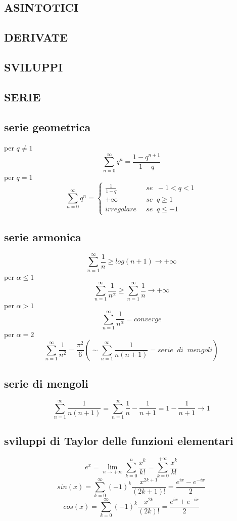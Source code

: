 \documentclass[a4paper, 9pt]{report}
\begin{document}
\subsection*{ASINTOTICI}
\subsection*{DERIVATE}
\subsection*{SVILUPPI}
\subsection*{SERIE}
\subsection*{serie geometrica}
per $q \neq 1$
\[
    \sum_{n=0}^{\infty}q^n = \frac{1-q^{n+1}}{1-q}
\]
per $q = 1$
\[
    \sum_{n=0}^{\infty}q^n = \begin{cases}
        \frac{1}{1-q} & se \;\; -1<q<1\\
        +\infty &se \;\; q \geq 1\\
        irregolare \;\;& se \;\; q\leq-1 
    \end{cases}
\]
\subsection*{serie armonica}
\[
    \sum_{n=1}^{\infty}\frac{1}{n} \geq log(n+1) \rightarrow +\infty
\]
per $\alpha \leq 1$ 
\[
    \sum_{n=1}^{\infty} \frac{1}{n^\alpha} \geq \sum_{n=1}^{\infty}\frac{1}{n} \rightarrow +\infty
\]
per $\alpha > 1$ 
\[
    \sum_{n=1}^{\infty} \frac{1}{n^\alpha} = converge
\]
per $\alpha = 2$
\[
    \sum_{n=1}^{\infty}\frac{1}{n^2} = \frac{\pi^2}{6} (\sim  \sum_{n=1}^{\infty} \frac{1}{n(n+1)} = serie \;\; di \;\; mengoli)
\]
\subsection*{serie di mengoli}
\[
    \sum_{n=1}^{\infty}\frac{1}{n(n+1)} = \sum_{n=1}^{\infty} \frac{1}{n}-\frac{1}{n+1} = 1- \frac{1}{n+1} \rightarrow 1
\]
\subsection*{sviluppi di Taylor delle funzioni elementari}
\[
    e^x = \lim_{n\rightarrow +\infty}\sum_{k=0}^{n} \frac{x^k}{k!} = \sum_{k=0}^{+\infty} \frac{x^k}{k!}
\]
\[
    sin (x) =\sum_{k=0}^{\infty}(-1)^k \frac{x^{2k+1}}{(2k+1)!} =  \frac{e^{ix} - e^{-ix}}{2}
\]
\[
    cos (x) =\sum_{k=0}^{\infty}(-1)^k \frac{x^{2k}}{(2k)!} =\frac{e^{ix} + e^{-ix}}{2}
\]
\end{document}
